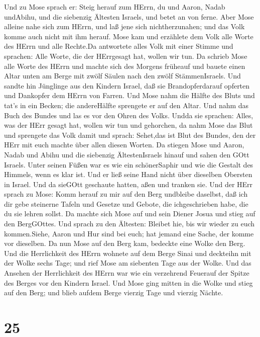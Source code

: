  Und zu Mose sprach er: Steig herauf zum HErrn, du und
Aaron, Nadab undAbihu, und die siebenzig Ältesten Israels, und betet an
von ferne.  Aber Mose alleine nahe sich zum HErrn, und laß
jene sich nichtherzunahen; und das Volk komme auch nicht mit ihm herauf.
 Mose kam und erzählete dem Volk alle Worte des HErrn und
alle Rechte.Da antwortete alles Volk mit einer Stimme und sprachen: Alle
Worte, die der HErrgesagt hat, wollen wir tun.  Da schrieb
Mose alle Worte des HErrn und machte sich des Morgens früheauf und
bauete einen Altar unten am Berge mit zwölf Säulen nach den zwölf
StämmenIsraels.  Und sandte hin Jünglinge aus den Kindern
Israel, daß sie Brandopferdarauf opferten und Dankopfer dem HErrn von
Farren.  Und Mose nahm die Hälfte des Bluts und tat's in ein
Becken; die andereHälfte sprengete er auf den Altar.  Und
nahm das Buch des Bundes und las es vor den Ohren des Volks. Undda sie
sprachen: Alles, was der HErr gesagt hat, wollen wir tun und gehorchen,
 da nahm Mose das Blut und sprengete das Volk damit und
sprach: Sehet,das ist Blut des Bundes, den der HErr mit euch machte über
allen diesen Worten.  Da stiegen Mose und Aaron, Nadab und
Abihu und die siebenzig ÄltestenIsraels hinauf  und sahen
den GOtt Israels. Unter seinen Füßen war es wie ein schönerSaphir und
wie die Gestalt des Himmels, wenn es klar ist.  Und er ließ
seine Hand nicht über dieselben Obersten in Israel. Und da sieGOtt
geschaute hatten, aßen und tranken sie.  Und der HErr
sprach zu Mose: Komm herauf zu mir auf den Berg undbleibe daselbst, daß
ich dir gebe steinerne Tafeln und Gesetze und Gebote, die ichgeschrieben
habe, die du sie lehren sollst.  Da machte sich Mose auf
und sein Diener Josua und stieg auf den BergGOttes.  Und
sprach zu den Ältesten: Bleibet hie, bis wir wieder zu euch
kommen.Siehe, Aaron und Hur sind bei euch; hat jemand eine Sache, der
komme vor dieselben.  Da nun Mose auf den Berg kam,
bedeckte eine Wolke den Berg.  Und die Herrlichkeit des
HErrn wohnete auf dem Berge Sinai und deckteihn mit der Wolke sechs
Tage; und rief Mose am siebenten Tage aus der Wolke.  Und
das Ansehen der Herrlichkeit des HErrn war wie ein verzehrend Feuerauf
der Spitze des Berges vor den Kindern Israel.  Und Mose
ging mitten in die Wolke und stieg auf den Berg; und blieb aufdem Berge
vierzig Tage und vierzig Nächte.

\hypertarget{section-24}{%
\section{25}\label{section-24}}

